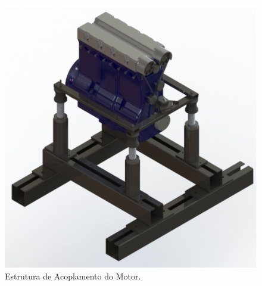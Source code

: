\begin{figure}[h!]
	\centering
	\includegraphics[keepaspectratio=true,scale= 0.4]{figuras/estruturamotor.png}
	\caption{Estrutura de Acoplamento do Motor.}
	\label{fig:estruturamotor}
\end{figure}
